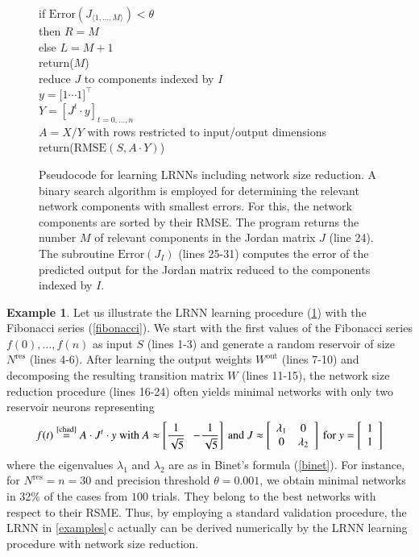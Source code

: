 \documentclass[preprint,12pt,times,authoryear]{elsarticle}%
\theoremstyle{definition}
\newtheorem{exmp}{Example}
\begin{document}
\begin{figure}
\begin{algorithmic}[1]
	\quad if $\mathrm{Error}(J_{\langle 1,\dots,M \rangle}) < \theta$\\
	\qquad then $R = M$\\
	\qquad else $L = M+1$\\
	return\big($M$\big)\newline
	\\
	\quad reduce $J$ to components indexed by $I$\\
	\quad $y = \big[ 1 \cdots 1 \big]^\top$\\
	\quad $Y = \left[J^t \cdot y\right]_{t=0,\dots,n}$ \\
	\quad $A = X/Y$ with rows restricted to input/output dimensions\\
	return\big($\mathrm{RMSE}(S,A \cdot Y)$\big)
\end{algorithmic}
\caption{Pseudocode for learning LRNNs including network size reduction. A
binary search algorithm is employed for determining the relevant network
components with smallest errors. For this, the network components are sorted by
their RMSE. The program returns the number $M$ of relevant components in the
Jordan matrix $J$ (line 24). The subroutine $\mathrm{Error}(J_I)$ (lines 25-31)
computes the error of the predicted output for the Jordan matrix reduced to the
components indexed by $I$.}
\label{proc}
\end{figure}

\begin{exmp}\label{continued}
Let us illustrate the LRNN learning procedure (\cref{proc}) with the Fibonacci
series (\cref{fibonacci}). We start with the first values of the Fibonacci
series $f(0),\dots,f(n)$ as input $S$ (lines 1-3) and generate a random
reservoir of size $N^\mathrm{res}$ (lines 4-6). After learning the output
weights $W^\mathrm{out}$ (lines 7-10) and decomposing the resulting transition
matrix $W$ (lines 11-15), the network size reduction procedure (lines 16-24)
often yields minimal networks with only two reservoir neurons representing
\[
    f(t) \overset{\text{\cref{chad}}}{=} A \cdot J^t \cdot y \text{~with~}
	A \approx \left[ \frac{1}{\sqrt{5}} ~~ -\!\frac{1}{\sqrt{5}} \right] \text{~and~}
	J \approx \left[ \begin{array}{cc}
		\lambda_1 & 0\\
		0 & \lambda_2
   	\end{array} \right] \text{~for~}
	y = \left[ \begin{array}{c}
	1\\
	1
   \end{array} \right]
\]
where the eigenvalues $\lambda_1$ and $\lambda_2$ are as in Binet's formula
(\cref{binet}). For instance, for $N^\mathrm{res}=n=30$ and precision threshold
$\theta=0.001$, we obtain minimal networks in 32\% of the cases from $100$
trials. They belong to the best networks with respect to their RSME. Thus,
by employing a standard validation procedure, the LRNN in \cref{examples}\,c
actually can be derived numerically by the LRNN learning procedure with network
size reduction.
\end{exmp}
\end{document}
